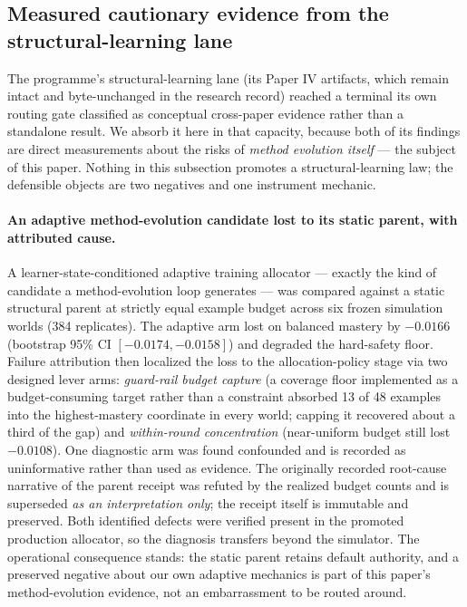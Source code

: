 \subsection{Measured cautionary evidence from the structural-learning lane}
\label{sec:structural-cautionary}

The programme's structural-learning lane (its Paper IV artifacts, which remain intact and byte-unchanged in the research record) reached a terminal its own routing gate classified as conceptual cross-paper evidence rather than a standalone result. We absorb it here in that capacity, because both of its findings are direct measurements about the risks of \emph{method evolution itself} --- the subject of this paper. Nothing in this subsection promotes a structural-learning law; the defensible objects are two negatives and one instrument mechanic.

\paragraph{An adaptive method-evolution candidate lost to its static parent, with attributed cause.}
A learner-state-conditioned adaptive training allocator --- exactly the kind of candidate a method-evolution loop generates --- was compared against a static structural parent at strictly equal example budget across six frozen simulation worlds (384 replicates). The adaptive arm lost on balanced mastery by $-0.0166$ (bootstrap 95\% CI $[-0.0174, -0.0158]$) and degraded the hard-safety floor. Failure attribution then localized the loss to the allocation-policy stage via two designed lever arms: \emph{guard-rail budget capture} (a coverage floor implemented as a budget-consuming target rather than a constraint absorbed 13 of 48 examples into the highest-mastery coordinate in every world; capping it recovered about a third of the gap) and \emph{within-round concentration} (near-uniform budget still lost $-0.0108$). One diagnostic arm was found confounded and is recorded as uninformative rather than used as evidence. The originally recorded root-cause narrative of the parent receipt was refuted by the realized budget counts and is superseded \emph{as an interpretation only}; the receipt itself is immutable and preserved. Both identified defects were verified present in the promoted production allocator, so the diagnosis transfers beyond the simulator. The operational consequence stands: the static parent retains default authority, and a preserved negative about our own adaptive mechanics is part of this paper's method-evolution evidence, not an embarrassment to be routed around.

